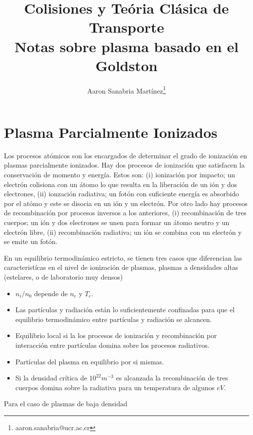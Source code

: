 \documentclass[11pt]{article}
\title{Colisiones y Te\'oria Cl\'asica de Transporte \\ \small{Notas sobre plasma basado en el Goldston} \cite{goldston1995introduction} }
\author{Aaron Sanabria Mart\'inez\footnote{aaron.sanabria@ucr.ac.cr}}
\theoremstyle{definition}
\begin{document}
  \maketitle
  \tableofcontents
	\thispagestyle{empty}
  
  \section{Plasma Parcialmente Ionizados} 

  Los procesos at\'omicos son los encargados de determinar el grado de ionizaci\'on en plasmas parcialmente ionizados. Hay dos procesos de ionizaci\'on que satisfacen la conservaci\'on de momento y energ\'ia. Estos son: (i) ionizaci\'on por impacto; un electr\'on colisiona con un \'atomo lo que resulta en la liberaci\'on de un i\'on y dos electrones, (ii) ionzaci\'on radiativa; un fot\'on con suficiente energ\'ia es absorbido por el at\'omo y este se disocia en un i\'on y un electr\'on.  Por otro lado hay procesos de recombinaci\'on por procesos inversos a los anteriores, (i) recombinaci\'on de tres cuerpos; un i\'on y dos electrones se unen para formar un \'atomo neutro y un electr\'on libre, (ii) recombinaci\'on radiativa; un i\'on se combina con un electr\'on y se emite un fot\'on. 

  En un equilibrio termodin\'amico estricto, se tienen tres casos que diferencian las caracterist\'icas en el nivel de ionizaci\'on de plasmas, plasmas a densidades altas (estelares, o de laboratorio muy densos)

  \begin{itemize}
    \item $n_i/n_0$ depende de $n_e$ y $T_e$.
    \item Las part\'iculas y radiaci\'on est\'an lo suficientemente confinadas para que el equilibrio termodin\'amico entre part\'iculas y radiaci\'on se alcancen.
    \item Equilibrio local si la los procesos de ionizaci\'on y recombinaci\'on por interacci\'on entre part\'iculas domina sobre los procesos radiativos. 
    \item Part\'iculas del plasma en equilibrio por si mismas. 
    \item Si la densidad cr\'itica de $10^{22}m^{-3}$ es alcanzada la recombinaci\'on de tres cuerpos domina sobre la radiativa para un temperatura de algunos $eV$.
  \end{itemize}

  Para el caso de plasmas de baja densidad
\end{document}
